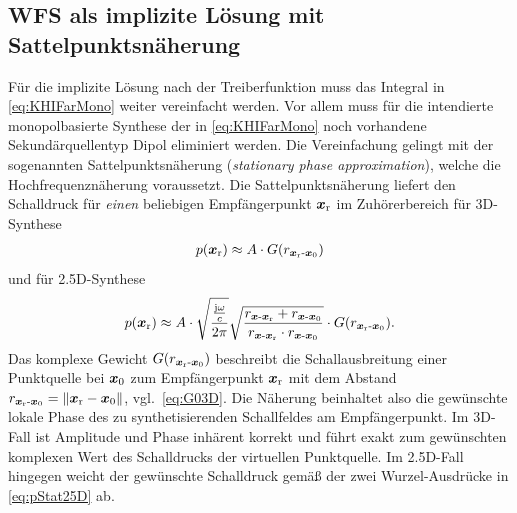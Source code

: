 \subsection{WFS als implizite Lösung mit Sattelpunktsnäherung}
%
Für die implizite Lösung nach der Treiberfunktion muss das Integral
in \Glg\eqref{eq:KHIFarMono} weiter vereinfacht werden.
%
Vor allem muss für die intendierte monopolbasierte Synthese
der in \Glg\eqref{eq:KHIFarMono} noch vorhandene Sekundärquellentyp Dipol
eliminiert werden.
%
Die Vereinfachung gelingt mit der sogenannten Sattelpunktsnäherung
(\textit{stationary phase approximation}), welche
die Hochfrequenznäherung voraussetzt.
%
Die Sattelpunktsnäherung liefert den Schalldruck für \textit{einen} beliebigen
Empfängerpunkt $\bm{x}_\mathrm{r}$ im Zuhörerbereich für 3D-Synthese
%
\begin{align}
\label{eq:pStat3D}
p(\bm{x}_\mathrm{r}) \approx A \cdot G(r_{\bm{x}_\mathrm{r}\text{-}\bm{x}_\mathrm{0}})
\end{align}
%
und für 2.5D-Synthese
%
\begin{align}
\label{eq:pStat25D}
p(\xr) \approx A\cdot
\sqrt{\frac{\frac{\im \omega}{c}}{2\pi}}\sqrt{\frac{r_{\xs\text{-}\xr} + r_{\xs\text{-}\xp}}{r_{\xs\text{-}\xr} \cdot r_{\xs\text{-}\xp}}}\cdot G(r_{\xr\text{-}\xp}).
\end{align}
%
Das komplexe Gewicht $G(r_{\bm{x}_\mathrm{r}\text{-}\bm{x}_\mathrm{0}})$ beschreibt die Schallausbreitung
einer Punktquelle
bei $\bm{x}_\mathrm{0}$ zum Empfängerpunkt $\bm{x}_\mathrm{r}$ mit dem Abstand $r_{\bm{x}_\mathrm{r}\text{-}\bm{x}_\mathrm{0}} = \|\bm{x}_\mathrm{r}-\bm{x}_\mathrm{0}\|$, vgl.~\eqref{eq:G03D}.
%
Die Näherung beinhaltet also die gewünschte lokale Phase des zu synthetisierenden
Schallfeldes am Empfängerpunkt.
%
Im 3D-Fall ist Amplitude und Phase inhärent korrekt und führt
exakt zum gewünschten komplexen Wert des Schalldrucks der virtuellen Punktquelle.
%
Im 2.5D-Fall hingegen weicht der gewünschte Schalldruck gemäß der zwei Wurzel-Ausdrücke
in \Glg\eqref{eq:pStat25D} ab.



